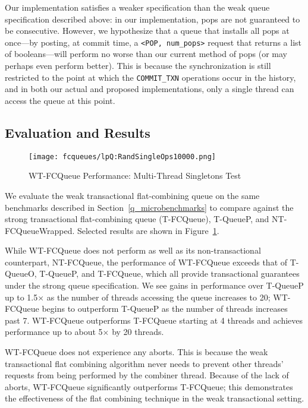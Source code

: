 Our implementation satisfies a weaker specification than the weak queue specification described above: in our implementation, pops are not guaranteed to be consecutive. However, we hypothesize that a queue that installs all pops at once---by posting, at commit time, a \texttt{<POP, num\_pops>} request that returns a list of booleans---will perform no worse than our current method of pops (or may perhaps even perform better). This is because the synchronization is still restricted to the point at which the \texttt{COMMIT\_TXN} operations occur in the history, and in both our actual and proposed implementations, only a single thread can access the queue at this point.

\subsection{Evaluation and Results}

\begin{figure}[t]
    \centering
    {\texttt{[image: fcqueues/lpQ:RandSingleOps10000.png]}}
    \caption{WT-FCQueue Performance: Multi-Thread Singletons Test}
    \label{fig:wtqs}
\end{figure}

We evaluate the weak transactional flat-combining queue on the same benchmarks described in Section~\ref{q_microbenchmarks} to compare against the strong transactional flat-combining queue (T-FCQueue), T-QueueP, and NT-FCQueueWrapped. Selected results are shown in Figure~\ref{fig:wtqs}.

While WT-FCQueue does not perform as well as its non-transactional counterpart, NT-FCQueue, the performance of WT-FCQueue exceeds that of T-QueueO, T-QueueP, and T-FCQueue, which all provide transactional guarantees under the strong queue specification. We see gains in performance over T-QueueP up to 1.5$\times$ as the number of threads accessing the queue increases to 20; WT-FCQueue begins to outperform T-QueueP as the number of threads increases past 7. WT-FCQueue outperforms T-FCQueue starting at 4 threads and achieves performance up to about 5$\times$ by 20 threads.
 
WT-FCQueue does not experience any aborts. This is because the weak transactional flat combining algorithm never needs to prevent other threads' requests from being performed by the combiner thread. Because of the lack of aborts, WT-FCQueue significantly outperforms T-FCQueue; this demonstrates the effectiveness of the flat combining technique in the weak transactional setting. 

